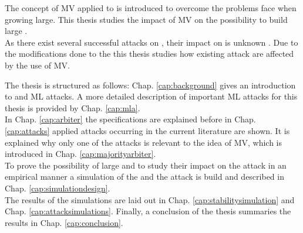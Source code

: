 The concept of \ac{MV} applied to \apufs is introduced to overcome the problems \xpufs face when growing large.
This thesis studies the impact of \ac{MV} on the possibility to build large \xpufs.\\
As there exist several successful attacks on \apufs, their impact on \mpuf is unknown \cite{Ganji2016PACPUFs,Ruhrmair2014PUFOverview}.
Due to the modifications done to the \apuf this thesis studies how existing attack are affected by the use of \ac{MV}.

The thesis is structured as follows: 
Chap. \ref{cap:background} gives an introduction to \pufs and \ac{ML} attacks.
A more detailed description of important \ac{ML} attacks for this thesis is provided by Chap. \ref{cap:mla}.\\
In Chap. \ref{cap:arbiter} the \apuf specifications are explained before in Chap. \ref{cap:attacks} applied attacks occurring in the current literature are shown.
It is explained why only one of the attacks is relevant to the idea of \ac{MV}, which is introduced in Chap. \ref{cap:majorityarbiter}.\\
To prove the possibility of large \mxpufs and to study their impact on the attack in an empirical manner a simulation of the \apuf and the attack is build and described in Chap. \ref{cap:simulationdesign}.\\
The results of the simulations are laid out in Chap. \ref{cap:stabilitysimulation} and Chap. \ref{cap:attacksimulations}.
Finally, a conclusion of the thesis summaries the results in Chap. \ref{cap:conclusion}.

